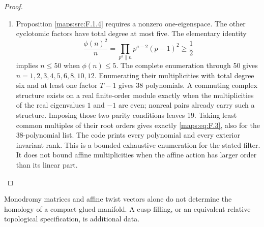 \begin{proof}
\begin{enumerate}[label=\arabic*.]
\item Proposition \ref{maps:src:F.1.4} requires a nonzero one-eigenspace.  The other
cyclotomic factors have total degree at most five.  The elementary
identity
\[
 \frac{\phi(n)^2}{n}=
 \prod_{p^a\parallel n}p^{a-2}(p-1)^2\geq\frac12
\]
implies $n\leq50$ when $\phi(n)\leq5$.
The complete enumeration through 50 gives
$n=1,2,3,4,5,6,8,10,12$.  Enumerating their multiplicities
with total degree six and at least one factor $T-1$ gives 38
polynomials.  A commuting complex structure exists on a real
finite-order module exactly when the multiplicities of the
real eigenvalues $1$ and $-1$ are even; nonreal pairs already
carry such a structure.  Imposing those two parity conditions
leaves 19.  Taking least common multiples of their root orders
gives exactly \eqref{maps:eq:F.3}, also for the 38-polynomial list.
The code prints every polynomial and every exterior invariant
rank.  This is a bounded exhaustive enumeration for the
stated filter.  It does not bound affine multiplicities when
the affine action has larger order than its linear part.

\end{enumerate}
\end{proof}




\begin{proposition}\label{maps:src:F.2.3}


Monodromy matrices and affine twist vectors alone do not
determine the homology of a compact glued manifold.  A cusp
filling, or an equivalent relative topological specification,
is additional data.

\end{proposition}


